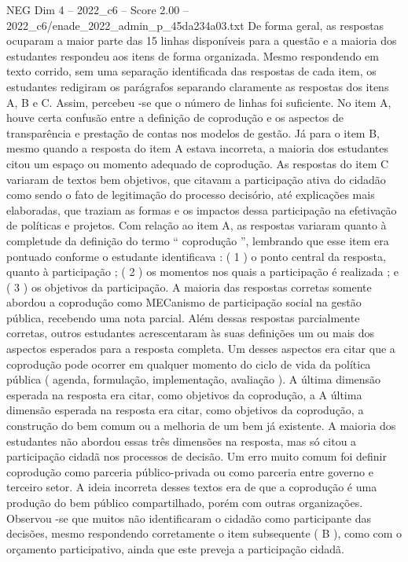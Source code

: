 \begin{textsample}{NEG Dim 4 – 2022\_c6 – Score 2.00 – 2022\_c6/enade\_2022\_admin\_p\_45da234a03.txt}
De forma geral, as respostas ocuparam a maior parte das 15 linhas disponíveis para a questão e a maioria dos estudantes respondeu aos itens de forma organizada.
Mesmo respondendo em texto corrido, sem uma separação identificada das respostas de cada item, os estudantes redigiram os parágrafos separando claramente as respostas dos itens A, B e C.
Assim, percebeu -se que o número de linhas foi suficiente.
No item A, houve certa confusão entre a definição de coprodução e os aspectos de transparência e prestação de contas nos modelos de gestão.
Já para o item B, mesmo quando a resposta do item A estava incorreta, a maioria dos estudantes citou um espaço ou momento adequado de coprodução.
As respostas do item C variaram de textos bem objetivos, que citavam a participação ativa do cidadão como sendo o fato de legitimação do processo decisório, até explicações mais elaboradas, que traziam as formas e os impactos dessa participação na efetivação de políticas e projetos.
Com relação ao item A, as respostas variaram quanto à completude da definição do termo “ coprodução ”, lembrando que esse item era pontuado conforme o estudante identificava : ( 1 ) o ponto central da resposta, quanto à participação ; ( 2 ) os momentos nos quais a participação é realizada ; e ( 3 ) os objetivos da participação.
A maioria das respostas corretas somente abordou a coprodução como MECanismo de participação social na gestão pública, recebendo uma nota parcial.
Além dessas respostas parcialmente corretas, outros estudantes acrescentaram às suas definições um ou mais dos aspectos esperados para a resposta completa.
Um desses aspectos era citar que a coprodução pode ocorrer em qualquer momento do ciclo de vida da política pública ( agenda, formulação, implementação, avaliação ).
A última dimensão esperada na resposta era citar, como objetivos da coprodução, a A última dimensão esperada na resposta era citar, como objetivos da coprodução, a construção do bem comum ou a melhoria de um bem já existente.
A maioria dos estudantes não abordou essas três dimensões na resposta, mas só citou a participação cidadã nos processos de decisão.
Um erro muito comum foi definir coprodução como parceria público-privada ou como parceria entre governo e terceiro setor.
A ideia incorreta desses textos era de que a coprodução é uma produção do bem público compartilhado, porém com outras organizações.
Observou -se que muitos não identificaram o cidadão como participante das decisões, mesmo respondendo corretamente o item subsequente ( B ), como com o orçamento participativo, ainda que este preveja a participação cidadã.

\end{textsample}
